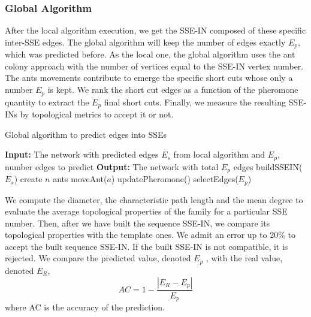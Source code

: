 \subsubsection{Global Algorithm}
After the local algorithm execution, we get the SSE-IN composed of these specific inter-SSE edges. The global algorithm will keep the number of edges exactly $E_p$, which was predicted before. As the local one, the global algorithm uses the ant colony approach with the number of vertices equal to the SSE-IN vertex number. The ants movements contribute to emerge the specific short cuts whose only a number $E_p$ is kept. We rank the short cut edges as a function of the pheromone quantity to extract the $E_p$ final short cuts. Finally, we measure the resulting SSE-INs by topological metrics to accept it or not.
\begin{algorithm}
\caption{Global algorithm to predict edges into SSEs}
\label{alg:global}
\begin{algorithmic}[1]
\STATE \textbf{Input:} The network with predicted edges $E_s$ from local algorithm and $E_p$, number edges to predict
\STATE \textbf{Output:} The network with total $E_p$ edges
\STATE buildSSEIN($E_s$)
\STATE create $n$ ants
\STATE moveAnt($a$)
\ENDFOR
\STATE updatePheromone()
\ENDWHILE
\STATE selectEdges($E_p$)
\end{algorithmic}
\end{algorithm}

We compute the diameter, the characteristic path length and the mean degree to evaluate the average topological properties of the family for a particular SSE number. Then, after we have built the sequence SSE-IN, we compare its topological properties with the template ones. We admit an error up to 20\% to accept the built sequence SSE-IN. If the built SSE-IN is not compatible, it is rejected. We compare the predicted value, denoted $E_p$ , with the real value, denoted $E_R$,
\begin{equation}
AC = 1 - \frac{|E_R - E_p|}{E_p}
\end{equation}
where AC is the accuracy of the prediction.